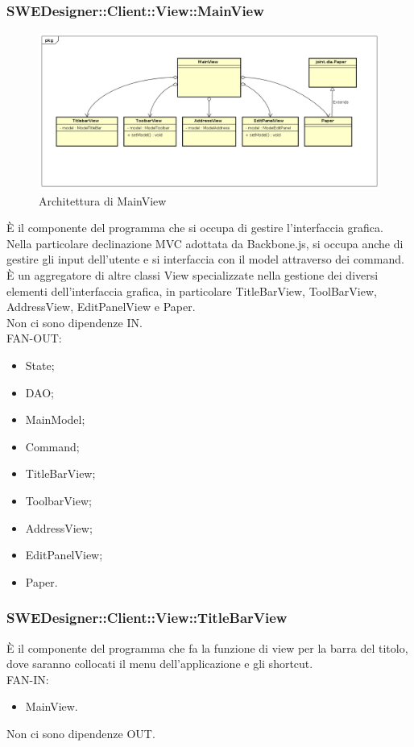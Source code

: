 \documentclass[../PianoDiQualifica.tex]{subfiles}
\begin{document}
		\subsubsection{SWEDesigner::Client::View::MainView}
			\begin{figure}[H]\label{fig:MainModel}
				\centering
				\includegraphics[scale=0.44]{Immagini/DiagrammaArchitettura/MainView.png}
				\caption{Architettura di MainView}
			\end{figure}
		È il componente del programma che si occupa di gestire l'interfaccia grafica. Nella particolare declinazione MVC adottata da Backbone.js, si occupa anche di gestire gli input dell'utente e si interfaccia con il model attraverso dei command. È un aggregatore di altre classi View specializzate nella gestione dei diversi elementi dell'interfaccia grafica, in particolare TitleBarView, ToolBarView, AddressView, EditPanelView e Paper.\\
		Non ci sono dipendenze IN.\\
			FAN-OUT:
			\begin{itemize}
				\item State;
				\item DAO;
				\item MainModel;
				\item Command;
				\item TitleBarView;
				\item ToolbarView;
				\item AddressView;
				\item EditPanelView;
				\item Paper.
			\end{itemize}
		\subsubsection{SWEDesigner::Client::View::TitleBarView}
		È il componente del programma che fa la funzione di view per la barra del titolo, dove saranno collocati il menu dell’applicazione e gli shortcut.\\
		FAN-IN:
		\begin{itemize}
			\item MainView.
		\end{itemize}
		Non ci sono dipendenze OUT.\\
\end{document}
